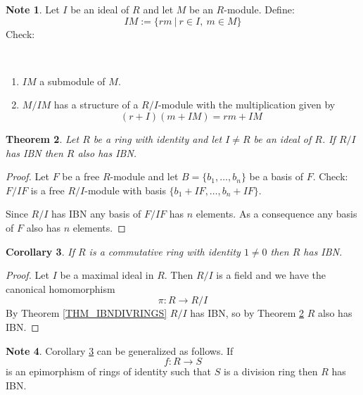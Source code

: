 \documentclass[12pt, letterpaper, oneside]{article}
\theoremstyle{plain}
\newtheorem{theorem}{Theorem}[section]
\newtheorem{corollary}[theorem]{Corollary}
\theoremstyle{definition}
\newtheorem{note}[theorem]{Note}
\newcommand{\benu}{\begin{enumerate}}
\newcommand{\eenu}{\end{enumerate}}
\newcommand{\vs}{\vskip 5mm}
\begin{document}
\begin{note}
Let $I$ be an ideal of $R$ and let $M$ be an $R$-module. Define:
$$IM := \{ rm \ | \ r\in I, \ m\in M \}$$
Check:

\vskip -13mm

\ 
\benu
\item $IM$ a submodule of $M$.
\item $M/IM$ has a structure of a $R/I$-module with the multiplication given by 
$$(r +I)(m + IM) = rm + IM$$
\eenu

\end{note}


\vs\vs


\begin{theorem}
\label{THM_QUOTIENTIBN}
Let $R$ be a ring with identity and let $I\neq R$ be an ideal of $R$. If  $R/I$ has   IBN 
then $R$ also has  IBN.
\end{theorem}


\begin{proof}
Let $F$ be a free $R$-module and let $B= \{b_{1}, \dots, b_{n}\}$ be a basis of $F$. 
Check: $F/IF$ is a free $R/I$-module with basis $\{ b_{1} + IF, \dots, b_{n}+IF\}$.

Since $R/I$ has  IBN any basis of $F/IF$ has $n$ elements. As a consequence any
basis of $F$ also has $n$ elements. 
\end{proof}


\vs\vs


\begin{corollary}
\label{COR_IBNCOMMMRINGS}
If $R$ is a commutative ring with identity $1\neq 0$ then $R$ has  IBN. 
\end{corollary}

\vs

\begin{proof}
Let $I$ be a maximal ideal in $R$. Then $R/I$ is a field and we have the canonical 
homomorphism 
$$\pi\colon R \to R/I$$
By Theorem \ref{THM_IBNDIVRINGS} $R/I$ has  IBN, so by Theorem \ref{THM_QUOTIENTIBN}
$R$ also has IBN. 
\end{proof}


\vs\vs


\begin{note}
Corollary \ref{COR_IBNCOMMMRINGS} can be generalized as follows. If 
$$f\colon R \to S$$
is an epimorphism of rings of identity such that $S$ is a division ring then $R$ 
has  IBN.   
\end{note}
 
 
\vs\vs\vs\vs\vs
\end{document}
